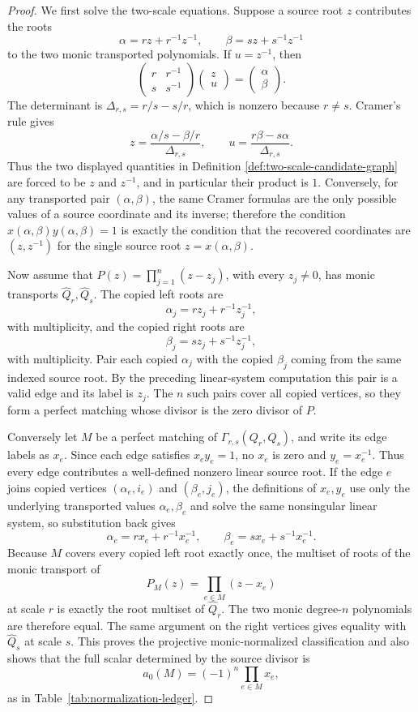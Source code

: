 \begin{proof}
We first solve the two-scale equations.  Suppose a source root \(z\)
contributes the roots
\[
\alpha=rz+r^{-1}z^{-1},
\qquad
\beta=sz+s^{-1}z^{-1}
\]
to the two monic transported polynomials.  If \(u=z^{-1}\), then
\[
\begin{pmatrix}
r&r^{-1}\\
s&s^{-1}
\end{pmatrix}
\begin{pmatrix}
z\\ u
\end{pmatrix}
=
\begin{pmatrix}
\alpha\\ \beta
\end{pmatrix}.
\]
The determinant is
\(\Delta_{r,s}=r/s-s/r\), which is nonzero because \(r\ne s\).
Cramer's rule gives
\[
z=\frac{\alpha/s-\beta/r}{\Delta_{r,s}},
\qquad
u=\frac{r\beta-s\alpha}{\Delta_{r,s}}.
\]
Thus the two displayed quantities in Definition
\ref{def:two-scale-candidate-graph} are forced to be \(z\) and
\(z^{-1}\), and in particular their product is \(1\).  Conversely,
for any transported pair \((\alpha,\beta)\), the same Cramer formulas
are the only possible values of a source coordinate and its inverse;
therefore the condition \(x(\alpha,\beta)y(\alpha,\beta)=1\) is
exactly the condition that the recovered coordinates are
\((z,z^{-1})\) for the single source root \(z=x(\alpha,\beta)\).

Now assume that \(P(z)=\prod_{j=1}^{n}(z-z_j)\), with every
\(z_j\ne0\), has monic transports \(\widehat Q_r,\widehat Q_s\).  The
copied left roots are
\[
\alpha_j=rz_j+r^{-1}z_j^{-1},
\]
with multiplicity, and the copied right roots are
\[
\beta_j=sz_j+s^{-1}z_j^{-1},
\]
with multiplicity.  Pair each copied \(\alpha_j\) with the copied
\(\beta_j\) coming from the same indexed source root.  By the preceding
linear-system computation this pair is a valid edge and its label is
\(z_j\).  The \(n\) such pairs cover all copied vertices, so they form
a perfect matching whose divisor is the zero divisor of \(P\).

Conversely let \(M\) be a perfect matching of
\(\Gamma_{r,s}(Q_r,Q_s)\), and write its edge labels as \(x_e\).  Since
each edge satisfies \(x_ey_e=1\), no \(x_e\) is zero and
\(y_e=x_e^{-1}\).  Thus every edge contributes a well-defined nonzero
linear source root.  If the edge \(e\) joins copied vertices
\((\alpha_e,i_e)\) and \((\beta_e,j_e)\), the definitions of
\(x_e,y_e\) use only the underlying transported values
\(\alpha_e,\beta_e\) and solve the same nonsingular linear system, so
substitution back
gives
\[
\alpha_e=rx_e+r^{-1}x_e^{-1},
\qquad
\beta_e=sx_e+s^{-1}x_e^{-1}.
\]
Because \(M\) covers every copied left root exactly once, the multiset
of roots of the monic transport of
\[
P_M(z)=\prod_{e\in M}(z-x_e)
\]
at scale \(r\) is exactly the root multiset of \(\widehat Q_r\).  The
two monic degree-\(n\) polynomials are therefore equal.  The same
argument on the right vertices gives equality with \(\widehat Q_s\) at
scale \(s\).  This proves the projective monic-normalized
classification and also shows that the full scalar determined by the
source divisor is
\[
a_0(M)=(-1)^n\prod_{e\in M}x_e,
\]
as in Table~\ref{tab:normalization-ledger}.


\end{proof}
